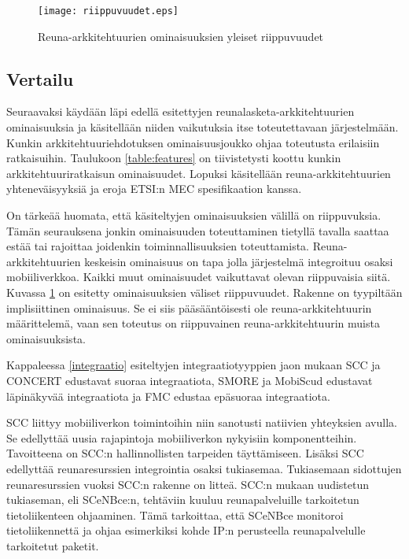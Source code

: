 \begin{figure}[tb]
\centering
\texttt{[image: riippuvuudet.eps]}
\caption{Reuna-arkkitehtuurien ominaisuuksien yleiset riippuvuudet} \label{fig:riippuvuudet}
\end{figure}

\subsection{Vertailu}
Seuraavaksi käydään läpi edellä esitettyjen reunalasketa-arkkitehtuurien ominaisuuksia ja käsitellään niiden vaikutuksia itse toteutettavaan järjestelmään.
Kunkin arkkitehtuuriehdotuksen ominaisuusjoukko ohjaa toteutusta erilaisiin ratkaisuihin. Taulukoon \ref{table:features} on tiivistetysti koottu kunkin arkkitehtuuriratkaisun ominaisuudet.
Lopuksi käsitellään reuna-arkkitehtuurien yhteneväisyyksiä ja eroja ETSI:n MEC spesifikaation kanssa.

On tärkeää huomata, että käsiteltyjen ominaisuuksien välillä on riippuvuksia. Tämän seurauksena jonkin ominaisuuden toteuttaminen tietyllä tavalla saattaa estää tai rajoittaa joidenkin toiminnallisuuksien toteuttamista. 
Reuna-arkkitehtuurien keskeisin ominaisuus on tapa jolla järjestelmä integroituu osaksi mobiiliverkkoa. Kaikki muut ominaisuudet vaikuttavat olevan riippuvaisia siitä.
Kuvassa \ref{fig:riippuvuudet} on esitetty ominaisuuksien väliset riippuvuudet.
Rakenne on tyypiltään implisiittinen ominaisuus. Se ei siis pääsääntöisesti ole reuna-arkkitehtuurin määrittelemä, vaan sen toteutus on riippuvainen reuna-arkkitehtuurin muista ominaisuuksista.

Kappaleessa \ref{integraatio} esiteltyjen integraatiotyyppien jaon mukaan SCC ja CONCERT edustavat suoraa integraatiota, SMORE ja MobiScud edustavat läpinäkyvää integraatiota ja FMC edustaa epäsuoraa integraatiota.

SCC liittyy mobiiliverkon toimintoihin niin sanotusti natiivien yhteyksien avulla. Se edellyttää uusia rajapintoja mobiiliverkon nykyisiin komponentteihin. Tavoitteena on SCC:n hallinnollisten tarpeiden täyttämiseen. Lisäksi SCC edellyttää reunaresurssien integrointia osaksi tukiasemaa. 
Tukiasemaan sidottujen reunaresurssien vuoksi SCC:n rakenne on litteä. 
SCC:n mukaan uudistetun tukiaseman, eli SCeNBce:n, tehtäviin kuuluu reunapalveluille tarkoitetun tietoliikenteen ohjaaminen. Tämä tarkoittaa, että SCeNBce monitoroi tietoliikennettä ja ohjaa esimerkiksi kohde IP:n perusteella reunapalvelulle tarkoitetut paketit.


